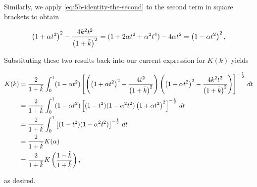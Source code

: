 \begin{solution}
  Similarly, we apply \eqref{eq:5b-identity-the-second} to the second term in square brackets to obtain

  $$
  \left(1 + \alpha t^2\right)^2 - \frac{4k^2t^2}{\left(1 + \tilde{k} \right)^2} 
    = (1 + 2 \alpha t^2 + \alpha^2 t^4) - 4 \alpha t^2
    = \left(1 - \alpha t^2\right)^2,
  $$

  Substituting these two results back into our current expression for $K(k)$ yields

  \begin{align*}
    K(k) &= \frac{2}{1 + \tilde{k}} \int_0^1 (1 - \alpha t^2)
            \left[
              \left(
                \left(1 + \alpha t^2\right)^2 - \frac{4t^2}{\left(1 + \tilde{k} \right)^2}
              \right)
              \left(
                \left(1 + \alpha t^2\right)^2 - \frac{4k^2t^2}{\left(1 + \tilde{k} \right)^2}
              \right)
            \right]^{-\frac{1}{2}} \, dt \\
         &= \frac{2}{1 + \tilde{k}} \int_0^1 (1 - \alpha t^2)
            \left[
              (1 - t^2)(1 - \alpha^2 t^2) \left(1 + \alpha t^2\right)^2 
            \right]^{-\frac{1}{2}} \, dt \\
         &= \frac{2}{1 + \tilde{k}} \int_0^1 
            \left[
              (1 - t^2)(1 - \alpha^2 t^2)
            \right]^{-\frac{1}{2}} \, dt \\
          &= \frac{2}{1 + \tilde{k}} K(\alpha) \\
          &= \frac{2}{1 + \tilde{k}} K\left(\frac{1 - \tilde{k}}{1 + \tilde{k}}\right),
  \end{align*}

  as desired.
  \ \\
\end{solution}